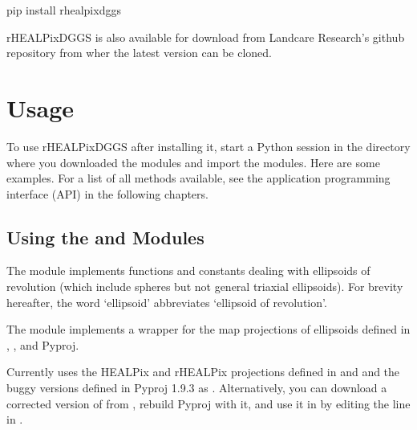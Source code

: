 \documentclass[a4paper,12ptopenany,oneside,english]{sphinxmanual}
\begin{document}
\sphinxAtStartPar
pip install rhealpixdggs

\sphinxAtStartPar
rHEALPixDGGS is also available for download from Landcare Research’s github repository  from wher the latest version can be cloned.


\section{Usage}
\label{\detokenize{introduction:usage}}
\sphinxAtStartPar
To use rHEALPixDGGS after installing it, start a Python session in the directory where you downloaded the modules and import the modules.
Here are some examples.
For a list of all methods available, see the application programming interface (API) in the following chapters.


\subsection{Using the  and  Modules}
\label{\detokenize{introduction:using-the-ellipsoids-and-projection-wrapper-modules}}
\sphinxAtStartPar
The  module implements functions and constants dealing with ellipsoids of revolution (which include spheres but not general triaxial ellipsoids).
For brevity hereafter, the word ‘ellipsoid’ abbreviates ‘ellipsoid of revolution’.

\sphinxAtStartPar
The module  implements a wrapper for the map projections of ellipsoids defined in , , and Pyproj.

\sphinxAtStartPar
Currently  uses the HEALPix and rHEALPix projections
defined in  and  and  the buggy versions  defined in Pyproj 1.9.3 as .
Alternatively, you can download a corrected version of  from
, rebuild Pyproj with it, and use it in  by editing the  line in .
\end{document}
